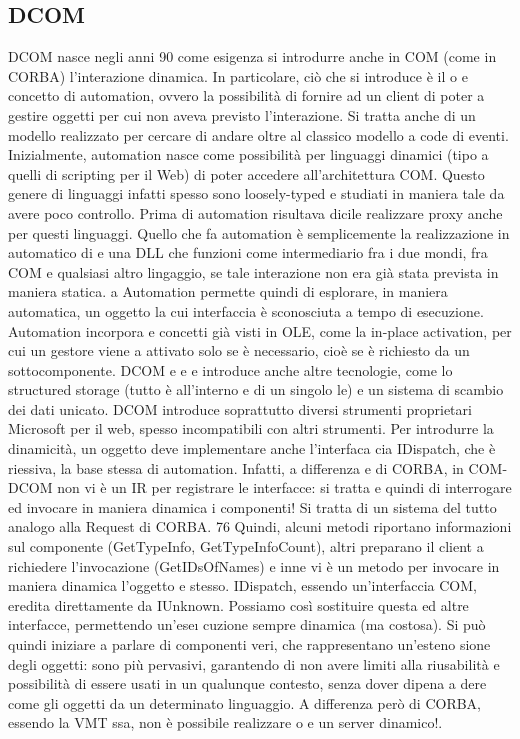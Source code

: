 \documentclass[a4paper,12pt]{article}
\begin{document}
\subsection{DCOM}
DCOM nasce negli anni 90 come esigenza si introdurre anche in COM (come
in CORBA) l'interazione dinamica. In particolare, ciò che si introduce è il
o
e
concetto di automation, ovvero la possibilità di fornire ad un client di poter
a
gestire oggetti per cui non aveva previsto l'interazione. Si tratta anche di un
modello realizzato per cercare di andare oltre al classico modello a code di eventi.
Inizialmente, automation nasce come possibilità per linguaggi dinamici (tipo
a
quelli di scripting per il Web) di poter accedere all'architettura COM. Questo
genere di linguaggi infatti spesso sono loosely-typed e studiati in maniera tale
da avere poco controllo. Prima di automation risultava dicile realizzare proxy
anche per questi linguaggi.
Quello che fa automation è semplicemente la realizzazione in automatico di
e
una DLL che funzioni come intermediario fra i due mondi, fra COM e qualsiasi
altro lingaggio, se tale interazione non era già stata prevista in maniera statica.
a
Automation permette quindi di esplorare, in maniera automatica, un oggetto
la cui interfaccia è sconosciuta a tempo di esecuzione. Automation incorpora
e
concetti già visti in OLE, come la in-place activation, per cui un gestore viene
a
attivato solo se è necessario, cioè se è richiesto da un sottocomponente. DCOM
e
e e
introduce anche altre tecnologie, come lo structured storage (tutto è all'interno
e
di un singolo le) e un sistema di scambio dei dati unicato. DCOM introduce
soprattutto diversi strumenti proprietari Microsoft per il web, spesso incompatibili con altri strumenti.
Per introdurre la dinamicità, un oggetto deve implementare anche l'interfaca
cia IDispatch, che è riessiva, la base stessa di automation. Infatti, a differenza
e
di CORBA, in COM-DCOM non vi è un IR per registrare le interfacce: si tratta
e
quindi di interrogare ed invocare in maniera dinamica i componenti! Si tratta
di un sistema del tutto analogo alla Request di CORBA.
76
Quindi, alcuni metodi riportano informazioni sul componente (GetTypeInfo,
GetTypeInfoCount), altri preparano il client a richiedere l'invocazione (GetIDsOfNames) e inne vi è un metodo per
invocare in maniera dinamica l'oggetto
e
stesso. IDispatch, essendo un'interfaccia COM, eredita direttamente da IUnknown. Possiamo così sostituire questa ed
altre interfacce, permettendo un'ese\i{}
cuzione sempre dinamica (ma costosa).
Si può quindi iniziare a parlare di componenti veri, che rappresentano un'esteno
sione degli oggetti: sono più pervasivi, garantendo di non avere limiti alla riusabilità e possibilità di essere usati
in un qualunque contesto, senza dover dipena
a
dere come gli oggetti da un determinato linguaggio.
A differenza però di CORBA, essendo la VMT ssa, non è possibile realizzare
o
e
un server dinamico!.
\end{document}
